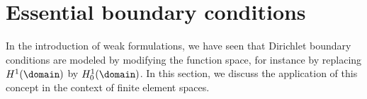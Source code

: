 \section{Essential boundary conditions}

\begin{intro}
  In the introduction of weak formulations, we have seen that
  Dirichlet boundary conditions are modeled by modifying the function
  space, for instance by replacing $H^1(\domain)$ by
  $H^1_0(\domain)$. In this section, we discuss the application of
  this concept in the context of finite element spaces.
\end{intro}

